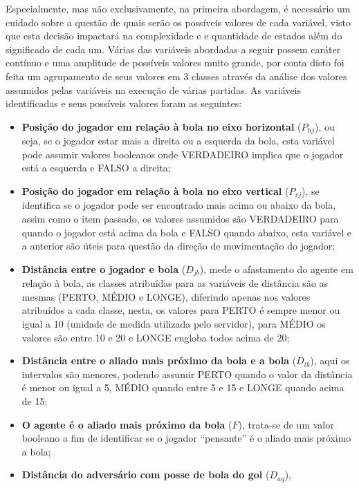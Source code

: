 Especialmente, mas não exclusivamente, na primeira abordagem, é necessário um
cuidado sobre a questão de quais serão os possíveis valores de cada variável,
visto que esta decisão impactará na complexidade e e quantidade de estados além
do significado de cada um. Várias das variáveis abordadas a seguir possem
caráter contínuo e uma amplitude de possíveis valores muito grande, por conta
disto foi feita um agrupamento de seus valores em 3 classes através da análise
dos valores assumidos pelas variáveis na execução de várias partidas. As
variáveis identificadas e seus possíveis valores foram as seguintes:

\begin{itemize}
    \item \textbf{Posição do jogador em relação à bola no eixo horizontal}
    ($P_{hj}$), ou seja, se o jogador estar mais a direita ou a esquerda da
    bola, esta variável pode assumir valores booleanos onde VERDADEIRO implica
    que o jogador está a esquerda e FALSO a direita;
    \item \textbf{Posição do jogador em relação à bola no eixo vertical}
    ($P_{vj}$), se identifica se o jogador pode ser encontrado mais acima ou
    abaixo da bola, assim como o item passado, os valores assumidos são
    VERDADEIRO para quando o jogador está acima da bola e FALSO quando abaixo,
    esta variável e a anterior são úteis para questão da direção de movimentação
    do jogador;
    \item \textbf{Distância entre o jogador e bola} ($D_{jb}$), mede o
    afastamento do agente em relação à bola, as classes atribuídas para as
    variáveis de distância são as mesmas (PERTO, MÉDIO e LONGE), diferindo
    apenas nos valores atribuídos a cada classe, nesta, os valores para PERTO é
    sempre menor ou igual a 10 (unidade de medida utilizada pelo servidor), para
    MÉDIO os valores são entre 10 e 20 e LONGE engloba todos acima de 20;
    \item \textbf{Distância entre o aliado mais próximo da bola e a bola}
    ($D_{tb}$), aqui os intervalos são menores, podendo assumir PERTO quando o
    valor da distância é menor ou igual a 5, MÉDIO quando entre 5 e 15 e LONGE
    quando acima de 15;
    \item \textbf{O agente é o aliado mais próximo da bola} ($F$), trata-se de
    um valor booleano a fim de identificar se o jogador ``pensante'' é o aliado
    mais próximo a bola;
    \item \textbf{Distância do adversário com posse de bola do gol} ($D_{ag}$),

\end{itemize}
